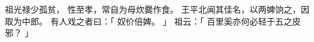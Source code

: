 
\switchcolumn*[\section{}]

祖光禄少孤贫，
性至孝，常自为母炊爨作食。
王平北闻其佳名，以两婢饷之，因取为中郎。
有人戏之者曰：「
    奴价倍婢。
」
祖云：「
    百里奚亦何必轻于五之皮邪？
」

\switchcolumn



